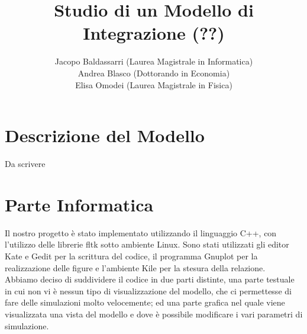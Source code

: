 \documentclass[a4paper,10pt]{article}
\title{\textbf{Studio di un Modello di Integrazione (??)}}
\author{Jacopo Baldassarri (Laurea Magistrale in Informatica)\\Andrea Blasco (Dottorando in Economia)\\Elisa Omodei (Laurea Magistrale in Fisica)}
\begin{document}
\maketitle


\section{Descrizione del Modello}
Da scrivere

\newpage

\section{Parte Informatica}
Il nostro progetto \`e stato implementato utilizzando il linguaggio C++, con l'utilizzo delle librerie fltk sotto ambiente Linux. Sono stati
utilizzati gli editor Kate e Gedit per la scrittura del codice, il programma Gnuplot per la realizzazione delle figure e l'ambiente Kile per
la stesura della relazione.\\
Abbiamo deciso 
di suddividere il codice in due parti distinte, una parte testuale in cui non vi \`e nessun tipo di visualizzazione del modello, che ci 
permettesse di fare delle simulazioni molto velocemente; ed una parte grafica nel quale viene visualizzata una vista del modello e dove \`e 
possibile modificare i vari parametri di simulazione.
\end{document}
